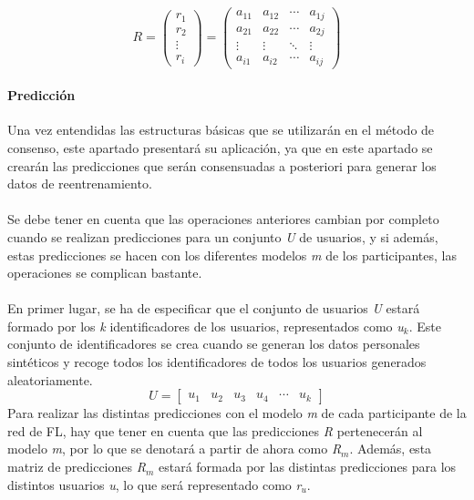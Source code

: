 \[  
    \textit{R} = 
    \begin{pmatrix}
        \textit{r$_{1}$}  \\ 
        \textit{r$_{2}$}  \\ 
        \vdots  \\ 
        \textit{r$_{i}$}
    \end{pmatrix} 
    =
    \begin{pmatrix}
        a_{11}  &  a_{12}  &  \cdots   & a_{1j} \\ 
        a_{21}  &  a_{22}  &  \cdots   & a_{2j}\\ 
        \vdots  &  \vdots  &  \ddots & \vdots  \\ 
        a_{i1}  &  a_{i2}  &  \cdots   & a_{ij}
    \end{pmatrix}
\]
\newpage
\paragraph{Predicción} Una vez entendidas las estructuras básicas que se utilizarán en el método de consenso, este apartado presentará su aplicación, ya que en este apartado se crearán las predicciones que serán consensuadas a posteriori para generar los datos de reentrenamiento.
\\ \\
Se debe tener en cuenta que las operaciones anteriores cambian por completo cuando se realizan predicciones para un conjunto \textit{U} de usuarios, y si además, estas predicciones se hacen con los diferentes modelos \textit{m} de los participantes, las operaciones se complican bastante. 
\\ \\
En primer lugar, se ha de especificar que el conjunto de usuarios \textit{U} estará formado por los \textit{k} identificadores de los usuarios, representados como \textit{u$_{k}$}. Este conjunto de identificadores se crea cuando se generan los datos personales sintéticos y recoge todos los identificadores de todos los usuarios generados aleatoriamente.
\[
        \textit{U} = \begin{bmatrix} \textit{u$_{1}$} & \textit{u$_{2}$} & \textit{u$_{3}$} & \textit{u$_{4}$} & \cdots & \textit{u$_{k}$} \end{bmatrix}
\]
Para realizar las distintas predicciones con el modelo \textit{m} de cada participante de la red de FL, hay que tener en cuenta que las predicciones \textit{R} pertenecerán al modelo \textit{m}, por lo que se denotará a partir de ahora como \textit{R$_{m}$}. Además, esta matriz de predicciones \textit{R$_{m}$} estará formada por las distintas predicciones para los distintos usuarios \textit{u}, lo que será representado como \textit{r$_{u}$}.
